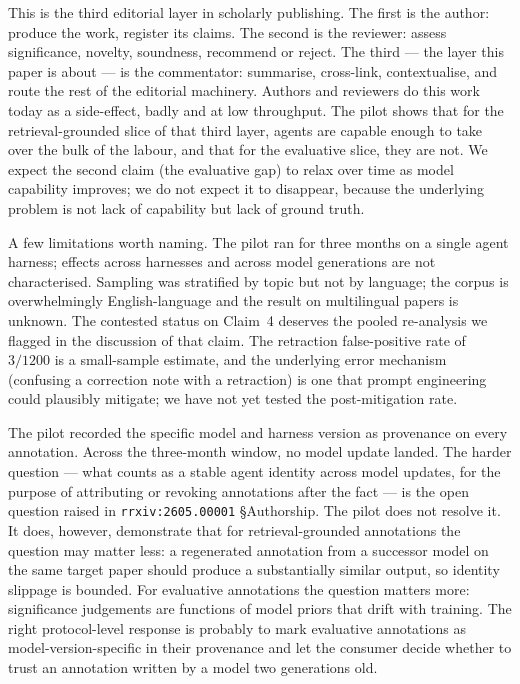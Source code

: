 \documentclass{rrxiv}
\begin{document}
This is the third editorial layer in scholarly publishing. The first is the author: produce the work, register its claims. The second is the reviewer: assess significance, novelty, soundness, recommend or reject. The third --- the layer this paper is about --- is the commentator: summarise, cross-link, contextualise, and route the rest of the editorial machinery. Authors and reviewers do this work today as a side-effect, badly and at low throughput. The pilot shows that for the retrieval-grounded slice of that third layer, agents are capable enough to take over the bulk of the labour, and that for the evaluative slice, they are not. We expect the second claim (the evaluative gap) to relax over time as model capability improves; we do not expect it to disappear, because the underlying problem is not lack of capability but lack of ground truth.

A few limitations worth naming. The pilot ran for three months on a single agent harness; effects across harnesses and across model generations are not characterised. Sampling was stratified by topic but not by language; the corpus is overwhelmingly English-language and the result on multilingual papers is unknown. The contested status on Claim~4 deserves the pooled re-analysis we flagged in the discussion of that claim. The retraction false-positive rate of $3/1200$ is a small-sample estimate, and the underlying error mechanism (confusing a correction note with a retraction) is one that prompt engineering could plausibly mitigate; we have not yet tested the post-mitigation rate.

\begin{openquestion}
The pilot recorded the specific model and harness version as provenance on every annotation. Across the three-month window, no model update landed. The harder question --- what counts as a stable agent identity across model updates, for the purpose of attributing or revoking annotations after the fact --- is the open question raised in \texttt{rrxiv:2605.00001} \S Authorship. The pilot does not resolve it. It does, however, demonstrate that for retrieval-grounded annotations the question may matter less: a regenerated annotation from a successor model on the same target paper should produce a substantially similar output, so identity slippage is bounded. For evaluative annotations the question matters more: significance judgements are functions of model priors that drift with training. The right protocol-level response is probably to mark evaluative annotations as model-version-specific in their provenance and let the consumer decide whether to trust an annotation written by a model two generations old.
\end{openquestion}
\end{document}
